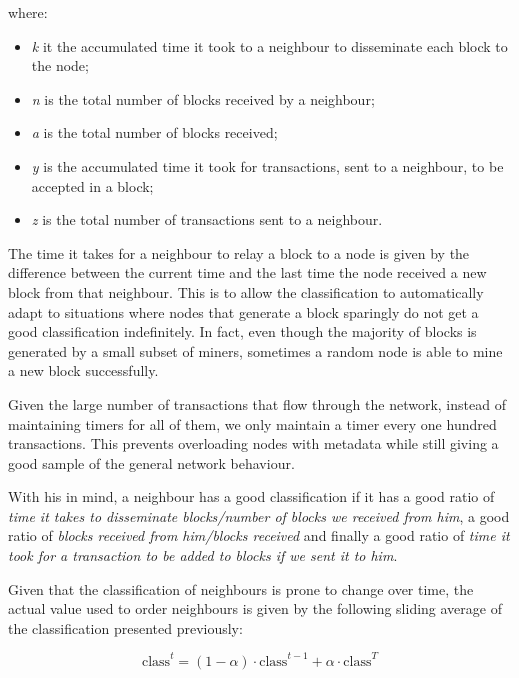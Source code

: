 where:
\begin{itemize}
  \item \textit{k} it the accumulated time it took to a neighbour to disseminate each block to the node;
  \item \textit{n} is the total number of blocks received by a neighbour;
  \item \textit{a} is the total number of blocks received;
  \item \textit{y} is the accumulated time it took for transactions, sent to a neighbour, to be accepted in a block;
  \item \textit{z} is the total number of transactions sent to a neighbour.
\end{itemize}

The time it takes for a neighbour to relay a block to a node is given by the difference between the current time and the last time the node received a new block from that neighbour.
This is to allow the classification to automatically adapt to situations where nodes that generate a block sparingly do not get a good classification indefinitely.
In fact, even though the majority of blocks is generated by a small subset of miners, sometimes a random node is able to mine a new block successfully.

Given the large number of transactions that flow through the network, instead of maintaining timers for all of them, we only maintain a timer every one hundred transactions. This prevents overloading nodes with metadata while still giving a good sample of the general network behaviour.

With his in mind, a neighbour has a good classification if it has a good ratio of \textsl{time it takes to disseminate blocks/number of blocks we received from him}, a good ratio of \textsl{blocks received from him/blocks received} and finally a good ratio of \textsl{time it took for a transaction to be added to blocks if we sent it to him}.

Given that the classification of neighbours is prone to change over time, the actual value used to order neighbours is given by the following sliding average of the classification presented previously:

\begin{displaymath} \mbox{class}^t = (1-\alpha) \cdot \mbox{class}^{t-1} + \alpha \cdot \mbox{class}^{T} \end{displaymath}

